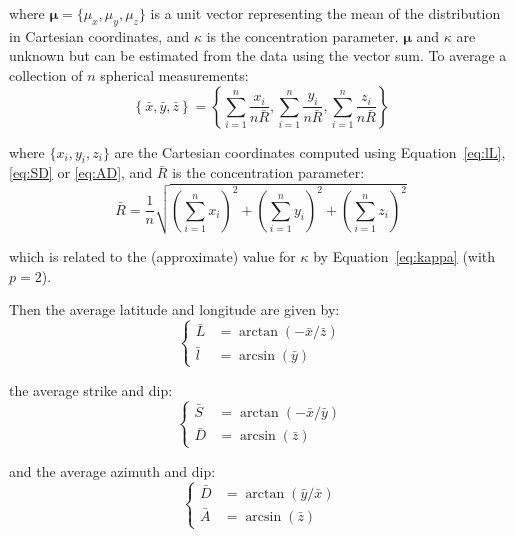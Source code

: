 \noindent where $\mathbf{\mu}=\{\mu_x,\mu_y,\mu_z\}$ is a unit vector
representing the mean of the distribution in Cartesian coordinates,
and $\kappa$ is the concentration parameter. $\mathbf{\mu}$ and
$\kappa$ are unknown but can be estimated from the data using the
vector sum. To average a collection of $n$ spherical measurements:
\begin{equation}
  \left\{\bar{x},\bar{y},\bar{z}\right\} =
  \left\{\sum_{i=1}^{n}\frac{x_i}{n\bar{R}},
  \sum_{i=1}^{n}\frac{y_i}{n\bar{R}},
  \sum_{i=1}^{n}\frac{z_i}{n\bar{R}}
  \right\}
\end{equation}

\noindent where $\{x_i,y_i,z_i\}$ are the Cartesian coordinates
computed using Equation~\ref{eq:lL}, \ref{eq:SD} or \ref{eq:AD},
and $\bar{R}$ is the concentration parameter:
\begin{equation}
  \bar{R} = \frac{1}{n}
    \sqrt{\left(\sum_{i=1}^{n}x_i\right)^2 +
      \left(\sum_{i=1}^{n}y_i\right)^2 +
      \left(\sum_{i=1}^{n}z_i\right)^2
    }
\end{equation}

\noindent which is related to the (approximate) value for $\kappa$ by
Equation~\ref{eq:kappa} (with $p=2$).

Then the average latitude and longitude are given by:
\begin{equation}
  \left\{
  \begin{split}
  \bar{L} & = \arctan\left(-\bar{x}/\bar{z}\right)\\
  \bar{l} & = \arcsin\left(\bar{y}\right)
  \end{split}
  \right.
\end{equation}

\noindent the average strike and dip:
\begin{equation}
  \left\{
  \begin{split}
    \bar{S} & = \arctan\left(-\bar{x}/\bar{y}\right)\\
    \bar{D} & = \arcsin\left(\bar{z}\right)
  \end{split}
  \right.
\end{equation}

\noindent and the average azimuth and dip:
\begin{equation}
  \left\{
  \begin{split}
    \bar{D} & = \arctan\left(\bar{y}/\bar{x}\right)\\
    \bar{A} & = \arcsin\left(\bar{z}\right)
  \end{split}
  \right.
\end{equation}

